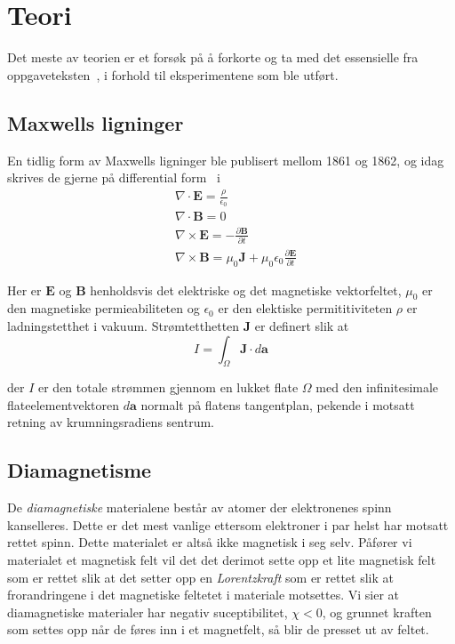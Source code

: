 \documentclass[a4paper,11pt, twocolumn]{article}
\begin{document}

\section{Teori}
Det meste av teorien er et forsøk på å forkorte og ta med det essensielle fra oppgaveteksten~\cite{oppgavesett}, i forhold til eksperimentene som ble utført.
\subsection{Maxwells ligninger}
En tidlig form av Maxwells ligninger ble publisert mellom 1861 og 1862, og idag skrives de gjerne på differential form~\cite[kap. 9.3.3]{griffithsED}
i
\begin{align}
	&\nabla\cdot\mathbf{E}= \frac{\rho}{\epsilon_0}
	\label{eq:max1}\\
	&\nabla\cdot\mathbf{B} = 0
	\label{eq:max2}\\
	&\nabla\times\mathbf{E} = -\frac{\partial \mathbf{B}}{\partial t}
	\label{eq:max3}\\
	&\nabla\times\mathbf{B} = \mu_0\mathbf{J}+\mu_0\epsilon_0\frac{\partial\mathbf{E}}{\partial t}
	\label{eq:max4}
\end{align}

Her er $\mathbf{E}$ og $\mathbf{B}$ henholdsvis det elektriske og det magnetiske vektorfeltet, $\mu_0$ er den magnetiske permieabiliteten og $\epsilon_0$ er den elektiske permititiviteten $\rho$ er ladningstetthet i vakuum. Strømtetthetten $\mathbf{J}$ er definert slik at 
\begin{equation}
	I = \int_\Omega \mathbf{J}\cdot d\mathbf{a}
	\label{eq:currentDensity}
\end{equation}

der $I$ er den totale strømmen gjennom en lukket flate $\Omega$ med den infinitesimale flateelementvektoren $d\mathbf{a}$ normalt på flatens tangentplan, pekende i motsatt retning av krumningsradiens sentrum. 
\subsection{Diamagnetisme}
De \textit{diamagnetiske} materialene består av atomer der elektronenes spinn kanselleres. Dette er det mest vanlige ettersom elektroner i par helst har motsatt rettet spinn. Dette materialet er altså ikke magnetisk i seg selv. Påfører vi materialet et magnetisk felt vil det det derimot sette opp et lite magnetisk felt som er rettet slik at det setter opp en \textit{Lorentzkraft} som er rettet slik at frorandringene i det magnetiske feltetet i materiale motsettes. Vi sier at diamagnetiske materialer har negativ suceptibilitet, $\chi <0$, og grunnet kraften som settes opp når de føres inn i et magnetfelt, så blir de presset ut av feltet.
\end{document}
